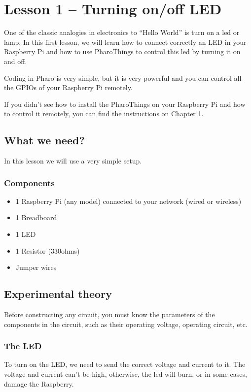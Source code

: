 \documentclass[10pt,twoside,english]{_support/latex/sbabook/sbabook}
\begin{document}
\frontmatter
\pagestyle{plain}

\tableofcontents*
\clearpage\listoffigures

\mainmatter

\chapter{Lesson 1 – Turning on/off LED }
One of the classic analogies in electronics to “Hello World” is turn on a led or lamp. In this first lesson, we will learn how to connect correctly an LED in your Raspberry Pi and how to use PharoThings to control this led by turning it on and off.

Coding in Pharo is very simple, but it is very powerful and you can control all the GPIOs of your Raspberry Pi remotely.

If you didn’t see how to install the PharoThings on your Raspberry Pi and how to control it remotely, you can find the instructions on Chapter 1.
\section{What we need?}
In this lesson we will use a very simple setup.
\subsection{Components}
\begin{itemize}
\item 1 Raspberry Pi (any model) connected to your network (wired or wireless)
\item 1 Breadboard
\item 1 LED
\item 1 Resistor (330ohms)
\item Jumper wires
\end{itemize}
\section{Experimental theory}
Before constructing any circuit, you must know the parameters of the components in the circuit, such as their operating voltage, operating circuit, etc.
\subsection{The LED}
To turn on the LED, we need to send the correct voltage and current to it. The voltage and current can’t be high, otherwise, the led will burn, or in some cases, damage the Raspberry.
\end{document}
